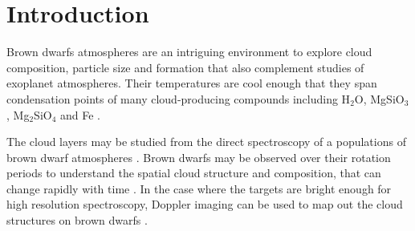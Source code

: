 \documentclass[twocolumn]{aastex6}
\begin{document}





\section{Introduction}

Brown dwarfs atmospheres are an intriguing environment to explore cloud composition, particle size and formation that also complement studies of exoplanet atmospheres.
Their temperatures are cool enough that they span condensation points of many cloud-producing  compounds including H$_2$O, MgSiO$_3$, Mg$_2$SiO$_4$ and Fe \citep{marley2015rev}.

The cloud layers may be studied from the direct spectroscopy of a populations of brown dwarf atmospheres \citep[e.g.][]{burgasser2006ltTrans,liu2006}.
Brown dwarfs may be observed over their rotation periods to understand the spatial cloud structure and composition, that can change rapidly with time \citep[e.g.][]{yang2016exStormsBD}.
In the case where the targets are bright enough for high resolution spectroscopy, Doppler imaging can be used to map out the cloud structures on brown dwarfs \citep{crossfield2014dopplerimg}.
\end{document}
